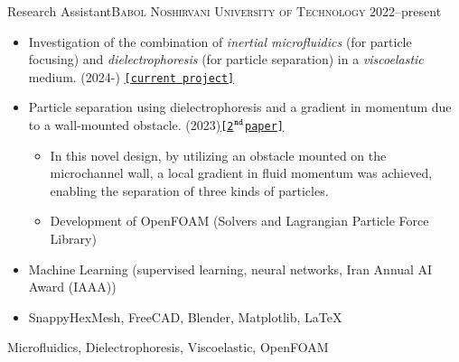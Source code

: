   \shorthandoff{:}

\begin{experiences}
  \experience
  {}   {Research Assistant}{\normalfont\textsc{Babol Noshirvani University of Technology}}{}
  {2022--present} {
    \begin{itemize}
      \item Investigation of the combination of \emph{inertial microfluidics} (for particle focusing) and \emph{dielectrophoresis} (for particle separation) in a \emph{viscoelastic} medium. (2024\thinspace-) \Dotfill\thinspace \hyperref[pub:bozorgzadeh2024]{\color{linkcolor}\texttt{[current project]}}
      \item Particle separation using dielectrophoresis and a gradient in momentum due to a wall-mounted obstacle. (2023)\Dotfill\thinspace \hyperref[pub:derakhshan2023]{\color{linkcolor}\texttt{[2$^{\rm{\texttt{nd}}}$\thinspace paper]}}
        \begin{itemize}
          \item In this novel design, by utilizing an obstacle mounted on the microchannel wall, a local gradient in fluid momentum was achieved, enabling the separation of three kinds of particles.
          \item Development of OpenFOAM  (Solvers and Lagrangian Particle Force Library)
        \end{itemize}
      \item Machine Learning (supervised learning, neural networks, Iran Annual AI Award (IAAA))
      \item SnappyHexMesh, FreeCAD, Blender, Matplotlib, \LaTeX
      \vspace{3pt}
    \end{itemize}
  }
  {Microfluidics, Dielectrophoresis, Viscoelastic, OpenFOAM}
\end{experiences}

\vspace{-3pt}

